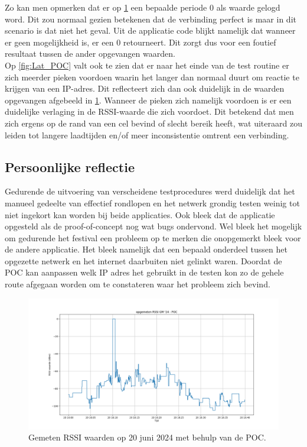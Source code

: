 Zo kan men opmerken dat er op \ref{fig:RSSI_POC} een bepaalde periode 0 als waarde gelogd word. Dit zou normaal gezien betekenen dat de verbinding perfect is maar in dit scenario is dat niet het geval. Uit de applicatie code blijkt namelijk dat wanneer er geen mogelijkheid is, er een 0 retourneert. Dit zorgt dus voor een foutief resultaat tussen de ander opgevangen waarden. \\

Op \ref{fig:Lat_POC} valt ook te zien dat er naar het einde van de test routine er zich meerder pieken voordoen waarin het langer dan normaal duurt om reactie te krijgen van een IP-adres. Dit reflecteert zich dan ook duidelijk in de waarden opgevangen afgebeeld in \ref{fig:RSSI_POC}. Wanneer de pieken zich namelijk voordoen is er een duidelijke verlaging in de RSSI-waarde die zich voordoet. Dit betekend dat men zich ergens op de rand van een cel bevind of slecht bereik heeft, wat uiteraard zou leiden tot langere laadtijden en/of meer inconsistentie omtrent een verbinding.

\subsection{Persoonlijke reflectie}

Gedurende de uitvoering van verscheidene testprocedures werd duidelijk dat het manueel gedeelte van effectief rondlopen en het netwerk grondig testen weinig tot niet ingekort kan worden bij beide applicaties. Ook bleek dat de applicatie opgesteld als de proof-of-concept nog wat bugs ondervond. Wel bleek het mogelijk om gedurende het festival een probleem op te merken die onopgemerkt bleek voor de andere applicatie. Het bleek namelijk dat een bepaald onderdeel tussen het opgezette netwerk en het internet daarbuiten niet gelinkt waren. Doordat de POC kan aanpassen welk IP adres het gebruikt in de testen kon zo de gehele route afgegaan worden om te constateren waar het probleem zich bevind.    

\pagebreak

\begin{figure}[!htb]
    \includegraphics[width=1.2\linewidth]{graphics/RSSI_graph_40min_POC}
    \caption[Gemeten RSSI waarden op 20 juni 2024 met behulp van de POC.]{Gemeten RSSI waarden op 20 juni 2024 met behulp van de POC.}
    \label{fig:RSSI_POC}
\end{figure}

